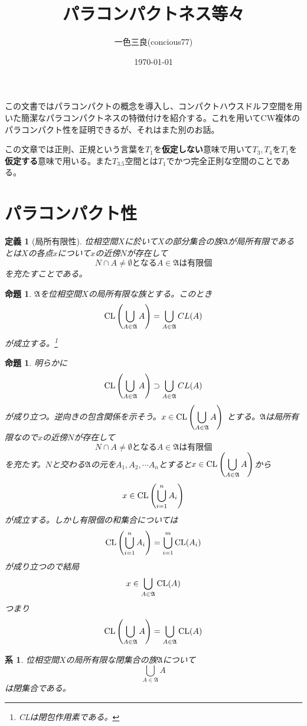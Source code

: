 \documentclass[leqno]{jsarticle}
\title{パラコンパクトネス等々}
\author{一色三良(concious77)}
\date{\today}
\newtheorem{prop}[thm]{命題}
\newtheorem{cor}[thm]{系}
\newtheorem{df}[thm]{定義}
\newcommand{\dpst}{\displaystyle}
\newcommand{\cl}{\text{{\rm CL}}}
\begin{document}
\maketitle
この文書ではパラコンパクトの概念を導入し、コンパクトハウスドルフ空間を用いた簡潔なパラコンパクトネスの特徴付けを紹介する。これを用いてCW複体のパラコンパクト性を証明できるが、それはまた別のお話。\par 
この文章では正則、正規という言葉を$T_1$を{\bf 仮定しない}意味で用いて$T_3,T_4$を$T_1$を{\bf 仮定する}意味で用いる。また$T_{3.5}$空間とは$T_1$でかつ完全正則な空間のことである。

\section{パラコンパクト性}

\begin{df}[局所有限性]位相空間$X$に於いて$X$の部分集合の族$\mathfrak{A}$が局所有限であるとは$X$の各点$x$について$x$の近傍$N$が存在して
\[
N\cap A\neq \emptyset となるA\in \mathfrak{A}は有限個
\]
を充たすことである。
\end{df}


\begin{prop}\label{heihou}
$\mathfrak{A}$を位相空間$X$の局所有限な族とする。このとき
\[
\cl\left(\bigcup_{A\in \mathfrak{A}}A\right)=\bigcup_{A\in \mathfrak{A}}CL(A)
\]
が成立する。\footnote{CLは閉包作用素である。}
\end{prop}
\begin{prop}
明らかに
\[
\cl\left(\bigcup_{A\in \mathfrak{A}}A\right)\supset \bigcup_{A\in \mathfrak{A}}CL(A)
\]
が成り立つ。逆向きの包含関係を示そう。$\dpst x\in \cl\left(\bigcup_{A\in \mathfrak{A}}A\right)$
とする。$\mathfrak{A}$は局所有限なので$x$の近傍$N$が存在して
\[
N\cap A\neq \emptyset となるA\in \mathfrak{A}は有限個
\]
を充たす。$N$と交わる$\mathfrak{A}$の元を$A_1,A_2,\cdots A_n$とすると$\dpst x\in \cl\left(\bigcup_{A\in \mathfrak{A}}A\right)$から
\[
x\in \cl\left(\bigcup_{i=1}^nA_i\right)
\]
が成立する。しかし有限個の和集合については
\[
\cl\left(\bigcup_{i=1}^nA_i\right)=\bigcup_{i=1}^m\cl(A_i)
\]
が成り立つので結局
\[
x\in \bigcup_{A\in \mathfrak{A}}\cl(A)
\]
つまり
\[
\cl\left(\bigcup_{A\in \mathfrak{A}}A\right)=\bigcup_{A\in \mathfrak{A}}\cl(A)
\]
\end{prop}

\begin{cor}
位相空間$X$の局所有限な閉集合の族$\mathfrak{A}$について
\[
\bigcup_{A\in \mathfrak{A}}A
\]
は閉集合である。
\end{cor}
\end{document}
